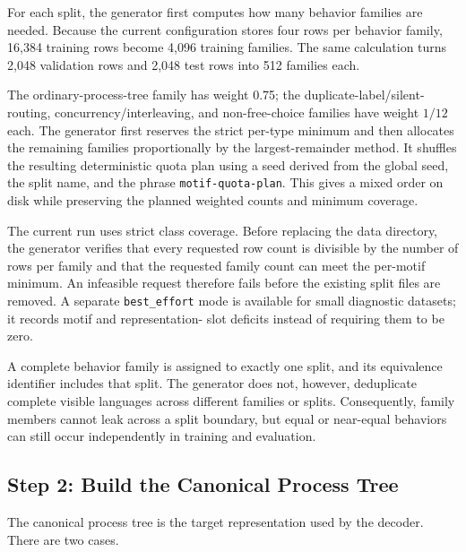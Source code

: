 \documentclass[manuscript,screen,nonacm]{acmart}
\begin{document}
For each split, the generator first computes how many behavior families are
needed. Because the current configuration stores four rows per behavior family,
16{,}384 training rows become 4{,}096 training families. The same calculation
turns 2{,}048 validation rows and 2{,}048 test rows into 512 families each.

The ordinary-process-tree family has weight 0.75; the duplicate-label/silent-
routing, concurrency/interleaving, and non-free-choice families have weight
$1/12$ each. The generator first reserves the strict per-type minimum and then
allocates the remaining families proportionally by the largest-remainder
method. It shuffles the resulting deterministic quota plan using a seed
derived from the global seed, the split name, and the phrase
\texttt{motif-quota-plan}. This gives a mixed order on disk while preserving
the planned weighted counts and minimum coverage.

The current run uses strict class coverage. Before replacing the data
directory, the generator verifies that every requested row count is divisible
by the number of rows per family and that the requested family count can meet
the per-motif minimum. An infeasible request therefore fails before the
existing split files are removed. A separate \texttt{best\_effort} mode is
available for small diagnostic datasets; it records motif and representation-
slot deficits instead of requiring them to be zero.

A complete behavior family is assigned to exactly one split, and its
equivalence identifier includes that split. The generator does not, however,
deduplicate complete visible languages across different families or splits.
Consequently, family members cannot leak across a split boundary, but equal or
near-equal behaviors can still occur independently in training and evaluation.

\subsection{Step 2: Build the Canonical Process Tree}
\label{app:build-tree}

The canonical process tree is the target representation used by the decoder.
There are two cases.
\end{document}
